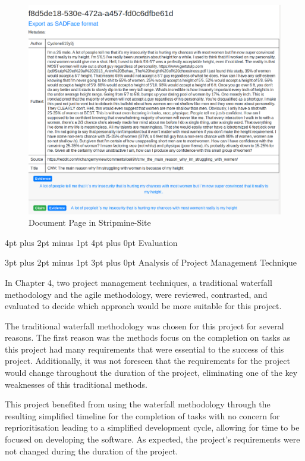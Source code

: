 \documentclass[12pt,a4paper]{article}
\makeatletter
\renewcommand\subsection{\@startsection {subsection}{1}{2mm} %
                               {3pt plus 2pt minus 1pt} %
                               {3pt plus 0pt} %
                               {\normalfont\bfseries}}
\renewcommand\section{\@startsection {section}{1}{0mm} %
                               {4pt plus 2pt minus 1pt} %
                               {4pt plus 0pt} %
                               {\bfseries}}
\makeatother
\begin{document}
\begin{figure}[H]
    \centering
    \includegraphics[scale=0.4]{Report/graphics/document.png}
    \caption{Document Page in Stripmine-Site}
    \label{fig:document}
\end{figure}

\newpage
\section{Evaluation}

\subsection{Analysis of Project Management Technique}

In Chapter 4, two project management techniques, a traditional waterfall methodology and the agile methodology, were reviewed, contrasted, and evaluated to decide which approach would be more suitable for this project.

The traditional waterfall methodology was chosen for this project for several reasons. The first reason was the methods focus on the completion on tasks as this project had many requirements that were essential to the success of this project. Additionally, it was not foreseen that the requirements for the project would change throughout the duration of the project, eliminating one of the key weaknesses of this traditional methods.

This project benefited from using the waterfall methodology through the resulting simplified timeline for the completion of tasks with no concern for reprioritisation leading to a simplified development cycle, allowing for time to be focused on developing the software. As expected, the project's requirements were not changed during the duration of the project.
\end{document}

